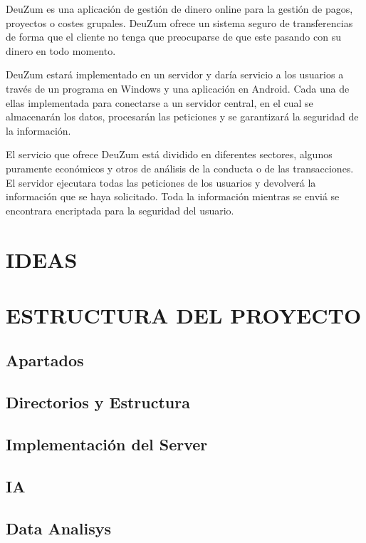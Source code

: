 \documentclass{article}
\theoremstyle{definition}
\begin{document}
DeuZum es una aplicación de gestión de dinero online para la gestión de pagos, proyectos o costes grupales. DeuZum ofrece un sistema seguro de transferencias de forma que el cliente no tenga que preocuparse de que este pasando con su dinero en todo momento.

DeuZum estará implementado en un servidor y daría servicio a los usuarios a través de un programa en Windows y una aplicación en Android. Cada una de ellas implementada para conectarse a un servidor central, en el cual se almacenarán los datos, procesarán las peticiones y se garantizará la seguridad de la información.

El servicio que ofrece DeuZum está dividido en diferentes sectores, algunos puramente económicos y otros de análisis de la conducta o de las transacciones. El servidor ejecutara todas las peticiones de los usuarios y devolverá la información que se haya solicitado. Toda la información mientras se enviá se encontrara encriptada para la seguridad del usuario.

\section{IDEAS}

\section{ESTRUCTURA DEL PROYECTO}

\subsection{Apartados}

\subsection{Directorios y Estructura}

\subsection{Implementación del Server}

\subsection{IA}

\subsection{Data Analisys}
\end{document}
